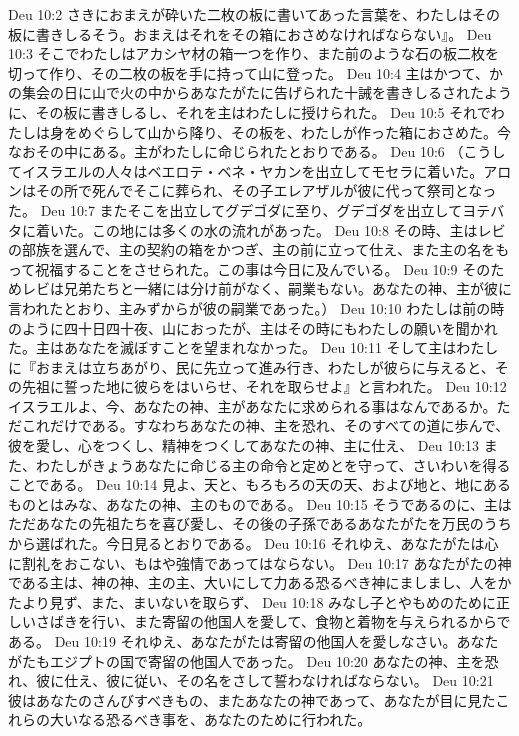 Deu 10:2  さきにおまえが砕いた二枚の板に書いてあった言葉を、わたしはその板に書きしるそう。おまえはそれをその箱におさめなければならない』。
Deu 10:3  そこでわたしはアカシヤ材の箱一つを作り、また前のような石の板二枚を切って作り、その二枚の板を手に持って山に登った。
Deu 10:4  主はかつて、かの集会の日に山で火の中からあなたがたに告げられた十誡を書きしるされたように、その板に書きしるし、それを主はわたしに授けられた。
Deu 10:5  それでわたしは身をめぐらして山から降り、その板を、わたしが作った箱におさめた。今なおその中にある。主がわたしに命じられたとおりである。
Deu 10:6  （こうしてイスラエルの人々はベエロテ・ベネ・ヤカンを出立してモセラに着いた。アロンはその所で死んでそこに葬られ、その子エレアザルが彼に代って祭司となった。
Deu 10:7  またそこを出立してグデゴダに至り、グデゴダを出立してヨテバタに着いた。この地には多くの水の流れがあった。
Deu 10:8  その時、主はレビの部族を選んで、主の契約の箱をかつぎ、主の前に立って仕え、また主の名をもって祝福することをさせられた。この事は今日に及んでいる。
Deu 10:9  そのためレビは兄弟たちと一緒には分け前がなく、嗣業もない。あなたの神、主が彼に言われたとおり、主みずからが彼の嗣業であった。）
Deu 10:10  わたしは前の時のように四十日四十夜、山におったが、主はその時にもわたしの願いを聞かれた。主はあなたを滅ぼすことを望まれなかった。
Deu 10:11  そして主はわたしに『おまえは立ちあがり、民に先立って進み行き、わたしが彼らに与えると、その先祖に誓った地に彼らをはいらせ、それを取らせよ』と言われた。
Deu 10:12  イスラエルよ、今、あなたの神、主があなたに求められる事はなんであるか。ただこれだけである。すなわちあなたの神、主を恐れ、そのすべての道に歩んで、彼を愛し、心をつくし、精神をつくしてあなたの神、主に仕え、
Deu 10:13  また、わたしがきょうあなたに命じる主の命令と定めとを守って、さいわいを得ることである。
Deu 10:14  見よ、天と、もろもろの天の天、および地と、地にあるものとはみな、あなたの神、主のものである。
Deu 10:15  そうであるのに、主はただあなたの先祖たちを喜び愛し、その後の子孫であるあなたがたを万民のうちから選ばれた。今日見るとおりである。
Deu 10:16  それゆえ、あなたがたは心に割礼をおこない、もはや強情であってはならない。
Deu 10:17  あなたがたの神である主は、神の神、主の主、大いにして力ある恐るべき神にましまし、人をかたより見ず、また、まいないを取らず、
Deu 10:18  みなし子とやもめのために正しいさばきを行い、また寄留の他国人を愛して、食物と着物を与えられるからである。
Deu 10:19  それゆえ、あなたがたは寄留の他国人を愛しなさい。あなたがたもエジプトの国で寄留の他国人であった。
Deu 10:20  あなたの神、主を恐れ、彼に仕え、彼に従い、その名をさして誓わなければならない。
Deu 10:21  彼はあなたのさんびすべきもの、またあなたの神であって、あなたが目に見たこれらの大いなる恐るべき事を、あなたのために行われた。
